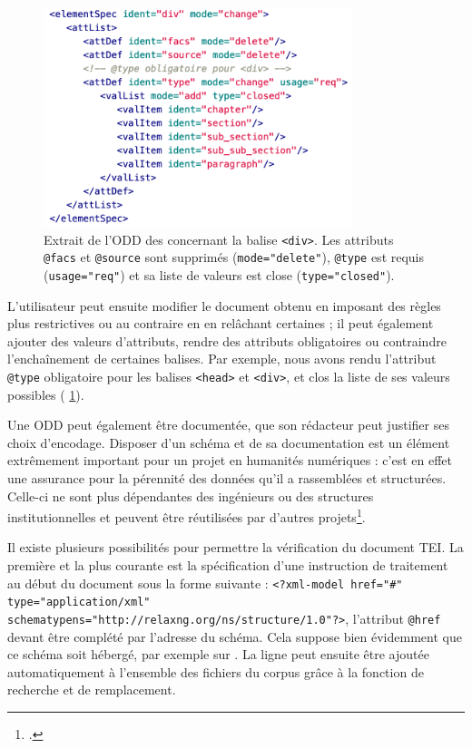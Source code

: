 \begin{figure}[h]
    \centering
    \includegraphics[width=9cm]{img/odd.png}
    \caption{Extrait de l'ODD des \odm{} concernant la balise \texttt{<div>}. Les attributs \texttt{@facs} et \texttt{@source} sont supprimés (\texttt{mode="delete"}), \texttt{@type} est requis (\texttt{usage="req"}) et sa liste de valeurs est close (\texttt{type="closed"}).}
    \label{fig:tei-odd-rng}
\end{figure}

L'utilisateur peut ensuite modifier le document obtenu en imposant des règles plus restrictives ou au contraire en en relâchant certaines ; il peut également ajouter des valeurs d'attributs, rendre des attributs obligatoires ou contraindre l'enchaînement de certaines balises. Par exemple, nous avons rendu l'attribut \texttt{@type} obligatoire pour les balises \texttt{<head>} et \texttt{<div>}, et clos la liste de ses valeurs possibles (\fig{} \ref{fig:tei-odd-rng}).

Une ODD peut également être documentée, \cad{} que son rédacteur peut justifier ses choix d'encodage. Disposer d'un schéma et de sa documentation est un élément extrêmement important pour un projet en humanités numériques : c'est en effet une assurance pour la pérennité des données qu'il a rassemblées et structurées. Celle-ci ne sont plus dépendantes des ingénieurs ou des structures institutionnelles et peuvent être réutilisées par d'autres projets\footcite[p. 61]{jolivet}.

Il existe plusieurs possibilités pour permettre la vérification du document TEI. La première et la plus courante est la spécification d'une instruction de traitement au début du document sous la forme suivante : \texttt{<?xml-model href="\#" type="application/xml" schematypens="http://relaxng.org/ns/structure/1.0"?>}, l'attribut \texttt{@href} devant être complété par l'adresse du schéma. Cela suppose bien évidemment que ce schéma soit hébergé, par exemple sur \gitlab. La ligne peut ensuite être ajoutée automatiquement à l'ensemble des fichiers du corpus grâce à la fonction de recherche et de remplacement.


